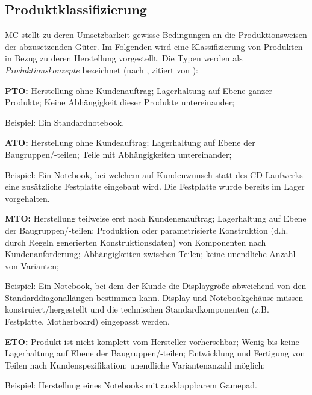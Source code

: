 \documentclass[11pt, a4paper, titlepage, listof=totoc, bibliography=totoc, index=totoc, twoside, openright, headings=normal, draft]{scrreprt}
\begin{document}
\subsection{Produktklassifizierung}
\label{Produktklassifizierung}

\ac{MC} stellt zu deren Umsetzbarkeit gewisse Bedingungen an die Produktionsweisen der abzusetzenden Güter. Im Folgenden wird eine Klassifizierung von Produkten in Bezug zu deren Herstellung vorgestellt. Die Typen werden als \emph{Produktionskonzepte} bezeichnet  (nach \citealt{schuh06}, zitiert von \citealt{lutz11}):
\begin{compactitem}
	\item[\textbf{\ac{PTO}:}] Herstellung ohne Kundenauftrag; Lagerhaltung auf Ebene ganzer Produkte; Keine Abhängigkeit dieser Produkte untereinander;\vspace{0.3em}
	
	Beispiel: Ein Standardnotebook.
	\item[\textbf{\ac{ATO}:}] Herstellung ohne Kundeauftrag; Lagerhaltung auf Ebene der Baugruppen/-teilen; Teile mit Abhängigkeiten untereinander;\vspace{0.3em}
	
	Beispiel: Ein Notebook, bei welchem auf Kundenwunsch statt des CD-Laufwerks eine zusätzliche Festplatte eingebaut wird. Die Festplatte wurde bereits im Lager vorgehalten.
	\item[\textbf{\ac{MTO}:}] Herstellung teilweise erst nach Kundenenauftrag; Lagerhaltung auf Ebene der Baugruppen/-teilen; Produktion oder parametrisierte Konstruktion (d.h. durch Regeln generierten Konstruktionsdaten) von Komponenten nach Kundenanforderung; Abhängigkeiten zwischen Teilen; keine unendliche Anzahl von Varianten;\vspace{0.3em}

Beispiel: Ein Notebook, bei dem der Kunde die Displaygröße abweichend von den Standarddiagonallängen bestimmen kann. Display und Notebookgehäuse müssen konstruiert/hergestellt und die technischen Standardkomponenten (z.B. Festplatte, Motherboard) eingepasst werden. 
	\item[\textbf{\ac{ETO}:}] Produkt ist nicht komplett vom Hersteller vorhersehbar; Wenig bis keine Lagerhaltung auf Ebene der Baugruppen/-teilen; Entwicklung und Fertigung von Teilen nach Kundenspezifikation; unendliche Variantenanzahl möglich;\vspace{0.3em}

Beispiel: Herstellung eines Notebooks mit ausklappbarem Gamepad.
\end{compactitem}
\end{document}
